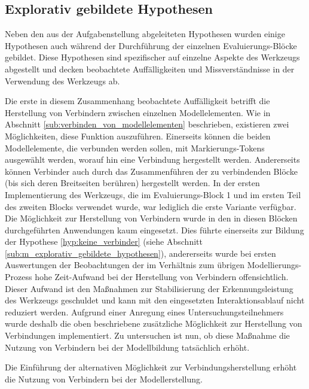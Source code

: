 
\subsection{Explorativ gebildete Hypothesen} %
\label{sub:explorativ_gebildete_hypothesen}

Neben den aus der Aufgabenstellung abgeleiteten Hypothesen wurden einige Hypothesen auch während der Durchführung der einzelnen Evaluierungs-Blöcke gebildet. Diese Hypothesen sind spezifischer auf einzelne Aspekte des Werkzeugs abgestellt und decken beobachtete Auffälligkeiten und Missverständnisse in der Verwendung des Werkzeugs ab. 

Die erste in diesem Zusammenhang beobachtete Auffälligkeit betrifft die Herstellung von Verbindern zwischen einzelnen Modellelementen. Wie in Abschnitt \ref{sub:verbinden_von_modellelementen} beschrieben, existieren zwei Möglichkeiten, diese Funktion auszuführen. Einerseits können die beiden Modellelemente, die verbunden werden sollen, mit Markierungs-Tokens ausgewählt werden, worauf hin eine Verbindung hergestellt werden. Andererseits können Verbinder auch durch das Zusammenführen der zu verbindenden Blöcke (bis sich deren Breitseiten berühren) hergestellt werden. In der ersten Implementierung des Werkzeugs, die im Evaluierungs-Block 1 und im ersten Teil des zweiten Blocks verwendet wurde, war lediglich die erste Variante verfügbar. Die Möglichkeit zur Herstellung von Verbindern wurde in den in diesen Blöcken durchgeführten Anwendungen kaum eingesetzt. Dies führte einerseits zur Bildung der Hypothese \ref{hyp:keine_verbinder} (siehe Abschnitt \ref{sub:m_explorativ_gebildete_hypothesen}), andererseits wurde bei ersten Auswertungen der Beobachtungen der im Verhältnis zum übrigen Modellierungs-Prozess hohe Zeit-Aufwand bei der Herstellung von Verbindern offensichtlich. Dieser Aufwand ist den Maßnahmen zur Stabilisierung der Erkennungsleistung des Werkzeugs geschuldet und kann mit den eingesetzten Interaktionsablauf nicht reduziert werden. Aufgrund einer Anregung eines Untersuchungsteilnehmers wurde deshalb die oben beschriebene zusätzliche Möglichkeit zur Herstellung von Verbindungen implementiert. Zu untersuchen ist nun, ob diese Maßnahme die Nutzung von Verbindern bei der Modellbildung tatsächlich erhöht.

\begin{hyp}
	\label{hyp:verbinder}
	Die Einführung der alternativen Möglichkeit zur Verbindungsherstellung erhöht die Nutzung von Verbindern bei der Modellerstellung.
\end{hyp}

